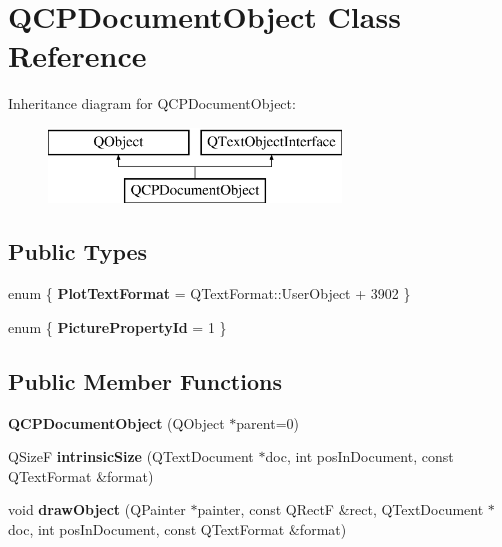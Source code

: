 \hypertarget{class_q_c_p_document_object}{}\section{Q\+C\+P\+Document\+Object Class Reference}
\label{class_q_c_p_document_object}
Inheritance diagram for Q\+C\+P\+Document\+Object\+:\begin{figure}[H]
\begin{center}
\leavevmode
\includegraphics[height=2.000000cm]{class_q_c_p_document_object}
\end{center}
\end{figure}
\subsection*{Public Types}
\begin{DoxyCompactItemize}
\item 
\mbox{\label{class_q_c_p_document_object_ac75dff14b39c4207ad9741cf28ff3702}} 
enum \{ {\bfseries Plot\+Text\+Format} = Q\+Text\+Format\+:\+:User\+Object + 3902
 \}
\item 
\mbox{\label{class_q_c_p_document_object_a21c21d7f72c88fb28b214c6fc38a032d}} 
enum \{ {\bfseries Picture\+Property\+Id} = 1
 \}
\end{DoxyCompactItemize}
\subsection*{Public Member Functions}
\begin{DoxyCompactItemize}
\item 
\mbox{\label{class_q_c_p_document_object_a527e0e61791e694ac5c4bb0dabab2cd9}} 
{\bfseries Q\+C\+P\+Document\+Object} (Q\+Object $\ast$parent=0)
\item 
\mbox{\label{class_q_c_p_document_object_ab9cf267cbdb566b5d2adad1f93cd3e91}} 
Q\+SizeF {\bfseries intrinsic\+Size} (Q\+Text\+Document $\ast$doc, int pos\+In\+Document, const Q\+Text\+Format \&format)
\item 
\mbox{\label{class_q_c_p_document_object_a556d629a63ec941e4d56869fcc4a36c7}} 
void {\bfseries draw\+Object} (Q\+Painter $\ast$painter, const Q\+RectF \&rect, Q\+Text\+Document $\ast$doc, int pos\+In\+Document, const Q\+Text\+Format \&format)
\end{DoxyCompactItemize}
